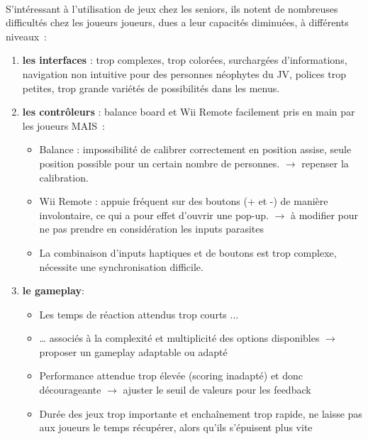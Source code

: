 \paragraph{}
S'intéressant à l'utilisation de jeux chez les seniors, ils notent de nombreuses difficultés chez les joueurs joueurs, dues a leur capacités diminuées, à différents niveaux~:
\begin{enumerate}
	\item \textbf{les interfaces} : trop complexes, trop colorées, surchargées d'informations, navigation non intuitive pour des personnes néophytes du JV, polices trop petites, trop grande variétés de possibilités dans les menus.
	\item \textbf{les contrôleurs} : balance board et Wii Remote facilement pris en main par les joueurs MAIS~:
	\begin{itemize}
		\item Balance : impossibilité de calibrer correctement en position assise, seule position possible pour un certain nombre de personnes. \newline
		$\rightarrow$ repenser la calibration.
		\item  Wii Remote : appuie fréquent sur des boutons (+ et -) de manière involontaire, ce qui a pour effet d'ouvrir une pop-up.\newline
		$\rightarrow$ à modifier pour ne pas prendre en considération les inputs parasites
		\item La combinaison d'inputs haptiques et de boutons est trop complexe, nécessite une synchronisation difficile.
	\end{itemize}
	\item \textbf{le gameplay}:
	\begin{itemize}
		\item Les temps de réaction attendus trop courts ...
		\item … associés à la complexité et multiplicité des options disponibles\newline
		$\rightarrow$ proposer un gameplay adaptable ou adapté
		\item Performance attendue trop élevée (scoring inadapté) et donc décourageante\newline
		$\rightarrow$ ajuster le seuil de valeurs pour les feedback
		\item Durée des jeux trop importante et enchaînement trop rapide, ne laisse pas aux joueurs le temps récupérer, alors qu'ils s'épuisent plus vite
	\end{itemize}	
\end{enumerate}
